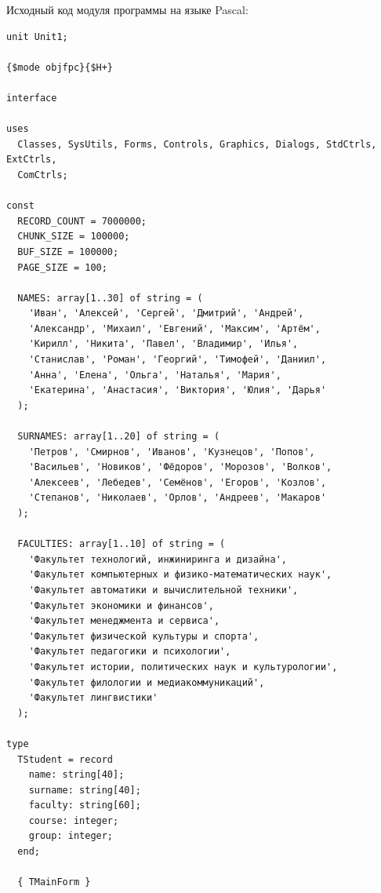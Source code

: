 \documentclass[a4paper,14pt]{extarticle}
\begin{document}
  Исходный код модуля программы на языке Pascal:

  \noindent
  \begin{Verbatim}[tabsize=4,fontsize=\small]
unit Unit1;

{$mode objfpc}{$H+}

interface

uses
  Classes, SysUtils, Forms, Controls, Graphics, Dialogs, StdCtrls, ExtCtrls,
  ComCtrls;

const
  RECORD_COUNT = 7000000;
  CHUNK_SIZE = 100000;
  BUF_SIZE = 100000;
  PAGE_SIZE = 100;

  NAMES: array[1..30] of string = (
    'Иван', 'Алексей', 'Сергей', 'Дмитрий', 'Андрей',
    'Александр', 'Михаил', 'Евгений', 'Максим', 'Артём',
    'Кирилл', 'Никита', 'Павел', 'Владимир', 'Илья',
    'Станислав', 'Роман', 'Георгий', 'Тимофей', 'Даниил',
    'Анна', 'Елена', 'Ольга', 'Наталья', 'Мария',
    'Екатерина', 'Анастасия', 'Виктория', 'Юлия', 'Дарья'
  );

  SURNAMES: array[1..20] of string = (
    'Петров', 'Смирнов', 'Иванов', 'Кузнецов', 'Попов',
    'Васильев', 'Новиков', 'Фёдоров', 'Морозов', 'Волков',
    'Алексеев', 'Лебедев', 'Семёнов', 'Егоров', 'Козлов',
    'Степанов', 'Николаев', 'Орлов', 'Андреев', 'Макаров'
  );

  FACULTIES: array[1..10] of string = (
    'Факультет технологий, инжиниринга и дизайна',
    'Факультет компьютерных и физико-математических наук',
    'Факультет автоматики и вычислительной техники',
    'Факультет экономики и финансов',
    'Факультет менеджмента и сервиса',
    'Факультет физической культуры и спорта',
    'Факультет педагогики и психологии',
    'Факультет истории, политических наук и культурологии',
    'Факультет филологии и медиакоммуникаций',
    'Факультет лингвистики'
  );

type
  TStudent = record
    name: string[40];
    surname: string[40];
    faculty: string[60];
    course: integer;
    group: integer;
  end;

  { TMainForm }


\end{Verbatim}
\end{document}
